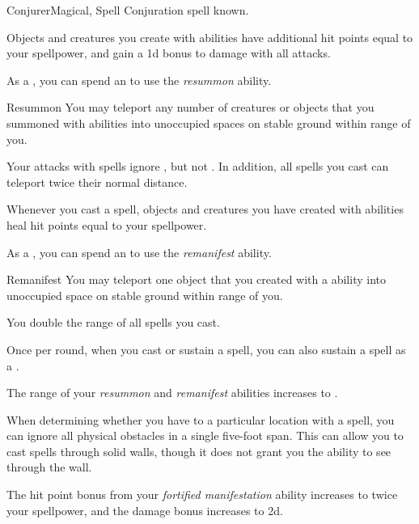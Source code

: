     \begin{feat}{Conjurer}{Magical, Spell}
        \featpre Conjuration spell known.

         Objects and creatures you create with  abilities have additional hit points equal to your spellpower, and gain a \plus1d bonus to damage with all attacks.

         As a , you can spend an  to use the \textit{resummon} ability.
        \begin{ability}{Resummon}
            You may teleport any number of creatures or objects that you summoned with  abilities into unoccupied spaces on stable ground within \rngclose range of you.
        \end{ability}

         Your attacks with spells ignore , but not .
        In addition, all  spells you cast can teleport twice their normal distance.

         Whenever you cast a spell, objects and creatures you have created with  abilities heal hit points equal to your spellpower.

         As a , you can spend an  to use the \textit{remanifest} ability.
        \begin{ability}{Remanifest}
            You may teleport one object that you created with a  ability into unoccupied space on stable ground within \rngclose range of you.
        \end{ability}

         You double the range of all spells you cast.

         Once per round, when you cast or sustain a spell, you can also sustain a  spell as a .

         The range of your \textit{resummon} and \textit{remanifest} abilities increases to \rnglong.

         When determining whether you have  to a particular location with a spell, you can ignore all physical obstacles in a single five-foot span.
        This can allow you to cast spells through solid walls, though it does not grant you the ability to see through the wall.

         The hit point bonus from your \textit{fortified manifestation} ability increases to twice your spellpower, and the damage bonus increases to \plus2d.
    \end{feat}


